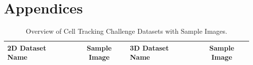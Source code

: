 \documentclass[./dissertation.tex]{subfiles}
\begin{document}
\chapter{Appendices}


\begin{table}[!ht]
  \centering
  \caption{Overview of Cell Tracking Challenge Datasets with Sample Images.}
  \label{tab:ctc_datasets_visual_summary}

  \begin{tabular}{|l|c|l|c|}
    \hline
    \textbf{2D Dataset Name} & \textbf{Sample Image}                                          & \textbf{3D Dataset Name} & \textbf{Sample Image}                                             \\ \hline


\end{tabular}
\end{table}
\end{document}
